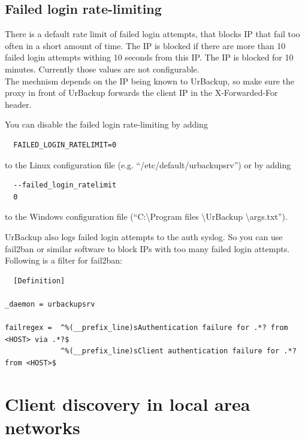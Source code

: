 \documentclass[a4paper,10pt]{article}
\begin{document}
\subsection{Failed login rate-limiting}

There is a default rate limit of failed login attempts, that blocks IP that fail too often in a short amount of time. The IP is blocked if there are more than 10 failed login attempts withing 10 seconds from this IP. The IP is blocked for 10 minutes. Currently those values are not configurable.\\
The mechnism depends on the IP being known to UrBackup, so make sure the proxy in front of UrBackup forwards the client IP in the X-Forwarded-For header.

You can disable the failed login rate-limiting by adding
\begin{verbatim}
  FAILED_LOGIN_RATELIMIT=0
\end{verbatim}
to the Linux configuration file (e.g. ``/etc/default/urbackupsrv'') or by adding
\begin{verbatim}
  --failed_login_ratelimit
  0
\end{verbatim}
to the Windows configuration file (``C:\textbackslash Program files \textbackslash UrBackup \textbackslash args.txt'').

UrBackup also logs failed login attempts to the auth syslog. So you can use fail2ban or similar software to block IPs with too many failed login attempts.
Following is a filter for fail2ban:

\begin{verbatim}
  [Definition]

_daemon = urbackupsrv

failregex =  ^%(__prefix_line)sAuthentication failure for .*? from <HOST> via .*?$
             ^%(__prefix_line)sClient authentication failure for .*? from <HOST>$
\end{verbatim}


\section{Client discovery in local area networks}
\label{client_discovery}
\end{document}
